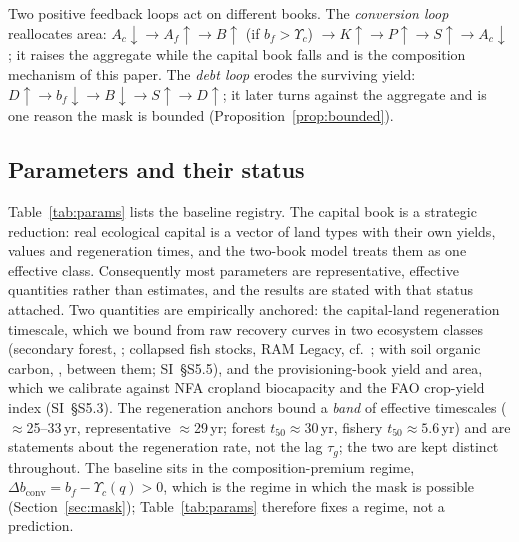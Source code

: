 \documentclass[preprint,12pt,authoryear]{elsarticle}
\newcommand{\dconv}{\Delta b_{\mathrm{conv}}}
\newcommand{\Ups}{\Upsilon_c}
\begin{document}
Two positive feedback loops act on different books. The \emph{conversion loop} reallocates area: $A_c\downarrow\to A_f\uparrow\to B\uparrow$ (if $b_f>\Ups$) $\to K\uparrow\to P\uparrow\to S\uparrow\to A_c\downarrow$; it raises the aggregate while the capital book falls and is the composition mechanism of this paper. The \emph{debt loop} erodes the surviving yield: $D\uparrow\to b_f\downarrow\to B\downarrow\to S\uparrow\to D\uparrow$; it later turns against the aggregate and is one reason the mask is bounded (Proposition~\ref{prop:bounded}).

\subsection{Parameters and their status}\label{sec:params}

Table~\ref{tab:params} lists the baseline registry. The capital book is a strategic reduction: real ecological capital is a vector of land types with their own yields, values and regeneration times, and the two-book model treats them as one effective class. Consequently most parameters are representative, effective quantities rather than estimates, and the results are stated with that status attached. Two quantities are empirically anchored: the capital-land regeneration timescale, which we bound from raw recovery curves in two ecosystem classes (secondary forest, \citealp{Poorter2016}; collapsed fish stocks, RAM Legacy, cf.\ \citealp{HutchingsReynolds2004,Neubauer2013}; with soil organic carbon, \citealp{Poeplau2011}, between them; SI~\S S5.5), and the provisioning-book yield and area, which we calibrate against NFA cropland biocapacity and the FAO crop-yield index (SI~\S S5.3). The regeneration anchors bound a \emph{band} of effective timescales ($\approx$25--33\,yr, representative $\approx$29\,yr; forest $t_{50}\approx30$\,yr, fishery $t_{50}\approx5.6$\,yr) and are statements about the regeneration rate, not the lag $\tau_g$; the two are kept distinct throughout. The baseline sits in the composition-premium regime, $\dconv=b_f-\Ups(q)>0$, which is the regime in which the mask is possible (Section~\ref{sec:mask}); Table~\ref{tab:params} therefore fixes a regime, not a prediction.
\end{document}
